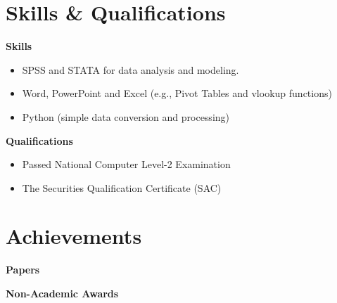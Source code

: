\documentclass[a4paper,20pt]{article}
\begin{document}
\section{Skills \& Qualifications}

\textbf{Skills}
    \begin{itemize}
    \centering
    \justifying
   	\item{SPSS and STATA for data analysis and modeling.}
            \vspace{-5pt}
	\item{Word, PowerPoint and Excel (e.g., Pivot Tables and vlookup functions)}
             \vspace{-5pt}
	\item{Python (simple data conversion and processing)}
    \end{itemize}
\textbf{Qualifications}
    \begin{itemize}
    \centering
    \justifying
	\item{Passed National Computer Level-2 Examination}
    \vspace{-5pt}
   	\item{The Securities Qualification Certificate (SAC)}
    \end{itemize}


\section{Achievements}
\textbf{Papers}
\nocite{*}

\textbf{Non-Academic Awards}
\end{document}
